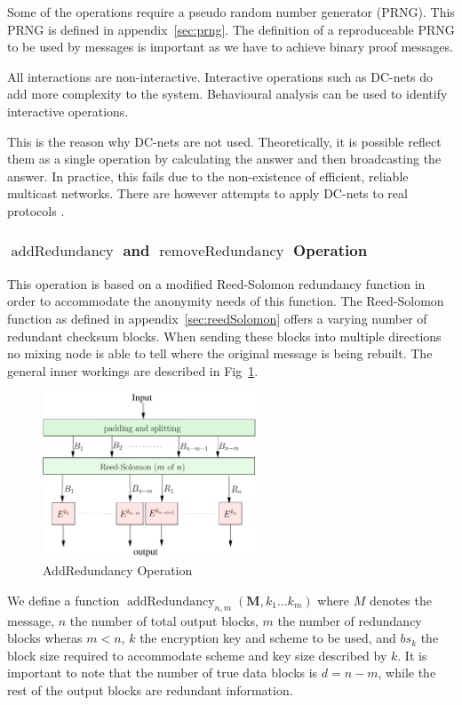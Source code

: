\documentclass[9pt,journal,compsoc]{IEEEtran}
\DeclareMathOperator{\addRedundancy}{addRedundancy}
\DeclareMathOperator{\removeRedundancy}{removeRedundancy}
\begin{document}
Some of the operations require a pseudo random number generator (PRNG). This PRNG is defined in appendix~\ref{sec:prng}. The definition of a reproduceable PRNG to be used by messages is important as we have to achieve binary proof messages.

All interactions are non-interactive. Interactive operations such as DC-nets do add more complexity to the system. Behavioural analysis can be used to identify interactive operations. 

This is the reason why DC-nets are not used. Theoretically, it is possible reflect them as a single operation by calculating the answer and then broadcasting the answer. In practice, this fails due to the non-existence of efficient, reliable multicast networks. There are however attempts to apply DC-nets to real protocols \cite{Corrigan-Gibbs:2010:DAA:1866307.1866346}.

\subsubsection{$\addRedundancy$ and $\removeRedundancy$ Operation}
This operation is based on a modified Reed-Solomon redundancy function in order to accommodate the anonymity needs of this function. The Reed-Solomon function as defined in appendix~\ref{sec:reedSolomon} offers a varying number of redundant checksum blocks. When sending these blocks into multiple directions no mixing node is able to tell where the original message is being rebuilt. The general inner workings are described in Fig~\ref{fig:addRedundancy}.

\begin{figure}[htb]
	\centering
	\includegraphics[width=2.5in]{../inc/addRedundancyOp}
	\caption{AddRedundancy Operation}
	\label{fig:addRedundancy}
\end{figure}

We define a function $\addRedundancy_{n,m}( \mathbf{M},k_1\ldots k_{m} )$ where $M$ denotes the message, $n$ the number of total output blocks, $m$ the number of redundancy blocks wheras $m<n$, $k$ the encryption key and scheme to be used, and $bs_k$ the block size required to accommodate scheme and key size described by $k$. It is important to note that the number of true data blocks is $d=n-m$, while the rest of the output blocks are redundant information.
\end{document}
